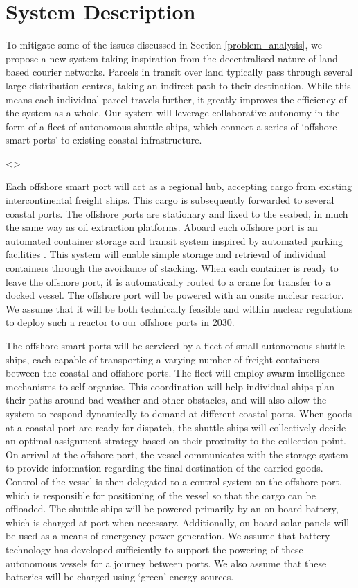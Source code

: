 \section{System Description}
To mitigate some of the issues discussed in Section \ref{problem_analysis}, we propose a new system taking inspiration from the decentralised nature of land-based courier networks. Parcels in transit over land typically pass through several large distribution centres, taking an indirect path to their destination. While this means each individual parcel travels further, it greatly improves the efficiency of the system as a whole. Our system will leverage collaborative autonomy in the form of a fleet of autonomous shuttle ships, which connect a series of `offshore smart ports’ to existing coastal infrastructure.

<>

Each offshore smart port will act as a regional hub, accepting cargo from existing intercontinental freight ships. This cargo is subsequently forwarded to several coastal ports. The offshore ports are stationary and fixed to the seabed, in much the same way as oil extraction platforms. Aboard each offshore port is an automated container storage and transit system inspired by automated parking facilities \cite{Mathijssen2007}. This system will enable simple storage and retrieval of individual containers through the avoidance of stacking. When each container is ready to leave the offshore port, it is automatically routed to a crane for transfer to a docked vessel. The offshore port will be powered with an onsite nuclear reactor. We assume that it will be both technically feasible and within nuclear regulations to deploy such a reactor to our offshore ports in 2030.

The offshore smart ports will be serviced by a fleet of small autonomous shuttle ships, each capable of transporting a varying number of freight containers between the coastal and offshore ports. The fleet will employ swarm intelligence mechanisms to self-organise. This coordination will help individual ships plan their paths around bad weather and other obstacles, and will also allow the system to respond dynamically to demand at different coastal ports. When goods at a coastal port are ready for dispatch, the shuttle ships will collectively decide an optimal assignment strategy based on their proximity to the collection point. On arrival at the offshore port, the vessel communicates with the storage system to provide information regarding the final destination of the carried goods. Control of the vessel is then delegated to a control system on the offshore port, which is responsible for positioning of the vessel so that the cargo can be offloaded. The shuttle ships will be powered primarily by an on board battery, which is charged at port when necessary. Additionally, on-board solar panels will be used as a means of emergency power generation. We assume that battery technology has developed sufficiently to support the powering of these autonomous vessels for a journey between ports. We also assume that these batteries will be charged using `green’ energy sources.

